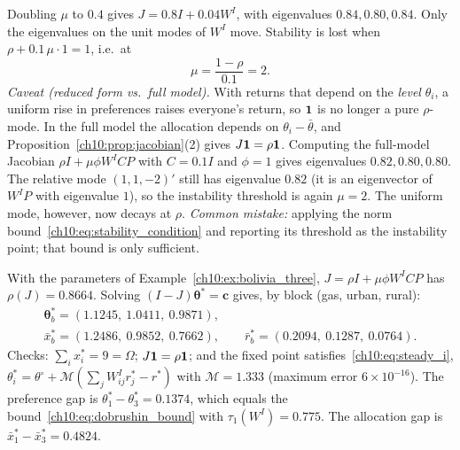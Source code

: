 \documentclass[../solutions_manual.tex]{subfiles}
\begin{document}
 Doubling $\mu$ to $0.4$ gives $J = 0.8I + 0.04W^I$, with eigenvalues $0.84, 0.80, 0.84$. Only the eigenvalues on the unit modes of $W^I$ move. Stability is lost when $\rho + 0.1\,\mu\cdot 1 = 1$, i.e.\ at
\[
\mu = \frac{1 - \rho}{0.1} = 2 .
\]
\textit{Caveat (reduced form vs.\ full model).} With returns that depend on the \emph{level} $\theta_i$, a uniform rise in preferences raises everyone's return, so $\mathbf{1}$ is no longer a pure $\rho$-mode. In the full model the allocation depends on $\theta_i - \bar\theta$, and Proposition~\ref{ch10:prop:jacobian}(2) gives $J\mathbf{1} = \rho\mathbf{1}$. Computing the full-model Jacobian $\rho I + \mu\phi W^I C P$ with $C = 0.1I$ and $\phi = 1$ gives eigenvalues $0.82, 0.80, 0.80$. The relative mode $(1,1,-2)'$ still has eigenvalue $0.82$ (it is an eigenvector of $W^IP$ with eigenvalue $1$), so the instability threshold is again $\mu = 2$. The uniform mode, however, now decays at $\rho$. \textit{Common mistake:} applying the norm bound~\eqref{ch10:eq:stability_condition} and reporting its threshold as the instability point; that bound is only sufficient.

 With the parameters of Example~\ref{ch10:ex:bolivia_three}, $J = \rho I + \mu\phi W^I C P$ has $\rho(J) = 0.8664$. Solving $(I-J)\boldsymbol{\theta}^* = \mathbf{c}$ gives, by block (gas, urban, rural):
\begin{gather*}
\boldsymbol{\theta}^*_b = (1.1245,\ 1.0411,\ 0.9871),\\
\bar x^*_b = (1.2486,\ 0.9852,\ 0.7662),\qquad \bar r^*_b = (0.2094,\ 0.1287,\ 0.0764).
\end{gather*}
Checks: $\sum_i x_i^* = 9 = \Omega$; $J\mathbf{1} = \rho\mathbf{1}$; and the fixed point satisfies~\eqref{ch10:eq:steady_i}, $\theta_i^* = \theta^{\circ} + \mathcal{M}(\sum_j W^I_{ij}r_j^* - r^*)$ with $\mathcal{M} = 1.333$ (maximum error $6\times 10^{-16}$). The preference gap is $\theta_1^* - \theta_3^* = 0.1374$, which equals the bound~\eqref{ch10:eq:dobrushin_bound} with $\tau_1(W^I) = 0.775$. The allocation gap is $\bar x_1^* - \bar x_3^* = 0.4824$.
\end{document}
